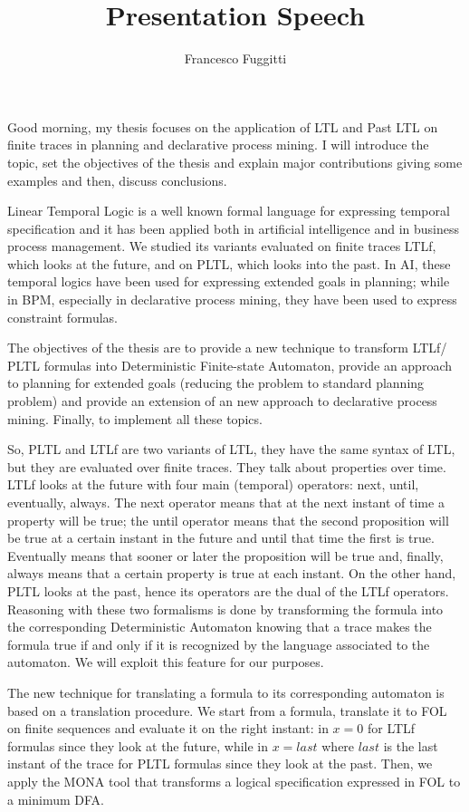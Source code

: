 \documentclass[]{article}
\title{\textbf{Presentation Speech}}
\author{Francesco Fuggitti}
\date{}
\begin{document}
\maketitle
Good morning, my thesis focuses on the application of LTL and Past LTL on finite traces in planning and declarative process mining. I will introduce the topic, set the objectives of the thesis and explain major contributions giving some examples and then, discuss conclusions.

\bigskip
Linear Temporal Logic is a well known formal language for expressing temporal specification and it has been applied both in artificial intelligence and in business process management. We studied its variants evaluated on finite traces LTLf, which looks at the future, and on  PLTL, which looks into the past. In AI, these temporal logics have been used for expressing extended goals  in planning; while in BPM, especially in declarative process mining, they have been used to express constraint formulas.

\bigskip
The objectives of the thesis are to provide a new technique to transform LTLf/ PLTL formulas into Deterministic Finite-state Automaton, provide an approach to planning for extended goals (reducing the problem to standard planning problem) and provide an extension of an new approach to declarative process mining. Finally, to implement all these topics.

\bigskip
So, PLTL and LTLf are two variants of LTL, they have the same syntax of LTL, but they are evaluated over finite traces. They talk about properties over time. LTLf looks at the future with four main (temporal) operators: next, until, eventually, always. The next operator means that at the next instant of time a property will be true; the until operator means that the second proposition will be true at a certain instant in the future and until that time the first is true. Eventually means that sooner or later the proposition will be true and, finally, always means that a certain property is true at each instant. On the other hand, PLTL looks at the past, hence its operators are the dual of the LTLf operators. Reasoning with these two formalisms is done by transforming the formula into the corresponding Deterministic Automaton knowing that a trace makes the formula true if and only if it is recognized by the language associated to the automaton. We will exploit this feature for our purposes.

\bigskip
The new technique for translating a formula to its corresponding automaton is based on a translation procedure. We start from a formula, translate it to FOL on finite sequences and evaluate it on the right instant: in $x=0$ for LTLf formulas since they look at the future, while in $x=last$ where $last$ is the last instant of the trace for PLTL formulas since they look at the past. Then, we apply the MONA  tool that transforms a logical specification expressed in FOL to a minimum DFA.
\end{document}
